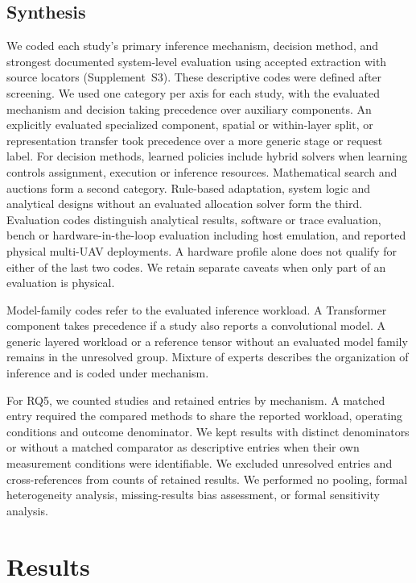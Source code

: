 \documentclass[pdflatex,sn-vancouver-num]{sn-jnl}
\begin{document}
\subsection{Synthesis}\label{sec:synthesis}
We coded each study's primary inference mechanism, decision method, and strongest documented system-level evaluation using accepted extraction with source locators (Supplement~S3). These descriptive codes were defined after screening. We used one category per axis for each study, with the evaluated mechanism and decision taking precedence over auxiliary components. An explicitly evaluated specialized component, spatial or within-layer split, or representation transfer took precedence over a more generic stage or request label. For decision methods, learned policies include hybrid solvers when learning controls assignment, execution or inference resources. Mathematical search and auctions form a second category. Rule-based adaptation, system logic and analytical designs without an evaluated allocation solver form the third. Evaluation codes distinguish analytical results, software or trace evaluation, bench or hardware-in-the-loop evaluation including host emulation, and reported physical multi-UAV deployments. A hardware profile alone does not qualify for either of the last two codes. We retain separate caveats when only part of an evaluation is physical.

Model-family codes refer to the evaluated inference workload. A Transformer component takes precedence if a study also reports a convolutional model. A generic layered workload or a reference tensor without an evaluated model family remains in the unresolved group. Mixture of experts describes the organization of inference and is coded under mechanism.

For RQ5, we counted studies and retained entries by mechanism. A matched entry required the compared methods to share the reported workload, operating conditions and outcome denominator. We kept results with distinct denominators or without a matched comparator as descriptive entries when their own measurement conditions were identifiable. We excluded unresolved entries and cross-references from counts of retained results. We performed no pooling, formal heterogeneity analysis, missing-results bias assessment, or formal sensitivity analysis.

\section{Results}\label{sec:results}
\end{document}
